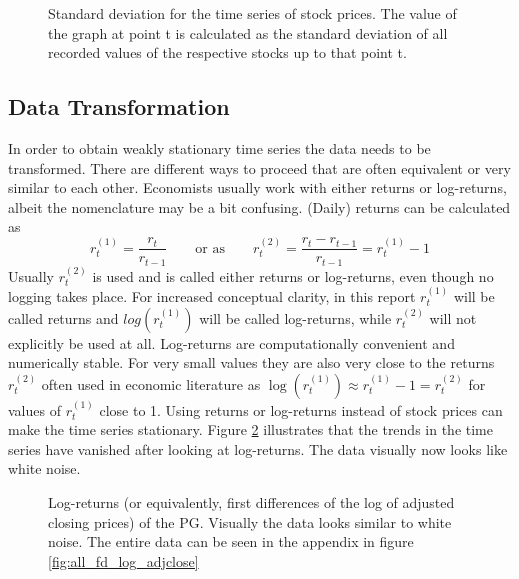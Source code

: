 \begin{figure}[H]
    \centering
    \begin{adjustbox}{width=.9\textwidth,center}
    
    \end{adjustbox}  
    \caption{Standard deviation for the time series of stock prices. The value of the graph at point t is calculated as the standard deviation of all recorded values of the respective stocks up to that point t.}
    \label{fig:cum_sd_all}
\end{figure}{}

\subsection{Data Transformation}

In order to obtain weakly stationary time series the data needs to be transformed. There are different ways to proceed that are often equivalent or very similar to each other. Economists usually work with either returns or log-returns, albeit the nomenclature may be a bit confusing. (Daily) returns can be calculated as
\begin{equation*}
    r^{\scriptscriptstyle{(1)} }_t = \frac{r_t}{r_{t-1}} \qquad \text{or as} \qquad r^{\scriptscriptstyle{(2)}}_t = \frac{r_t - r_{t-1}}{r_{t-1}} = r^{\scriptscriptstyle{(1)}}_t - 1
\end{equation*}{}
Usually $r^{\scriptscriptstyle{(2)}}_t$ is used and is called either returns or log-returns, even though no logging takes place. For increased conceptual clarity, in this report $r^{\scriptscriptstyle{(1)}}_t$ will be called returns and $log(r^{\scriptscriptstyle{(1)}}_t)$ will be called log-returns, while $r^{\scriptscriptstyle{(2)}}_t$ will not explicitly be used at all. Log-returns are computationally convenient and numerically stable. For very small values they are also very close to the returns $r^{\scriptscriptstyle{(2)}}_t$ often used in economic literature as $ \log(r^{\scriptscriptstyle{(1)}}_t) \approx r^{\scriptscriptstyle{(1)}}_t - 1 = r^{\scriptscriptstyle{(2)}}_t$ for values of $r^{\scriptscriptstyle{(1)}}_t$ close to 1. Using returns or log-returns instead of stock prices can make the time series stationary. Figure \ref{fig:PG_fd_log_adjclose} illustrates that the trends in the time series have vanished after looking at log-returns. The data visually now looks like white noise. 

\begin{figure}[H]
    \centering
    \begin{adjustbox}{width=.9\textwidth,center}
    
    \end{adjustbox}  
    \caption{Log-returns (or equivalently, first differences of the log of adjusted closing prices) of the PG. Visually the data looks similar to white noise. The entire data can be seen in the appendix in figure \ref{fig:all_fd_log_adjclose}}
    \label{fig:PG_fd_log_adjclose}
\end{figure}{}

